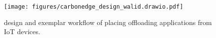 




\begin{figure}[t]
    \centering
    \texttt{[image: figures/carbonedge\_design\_walid.drawio.pdf]}
    \caption{\proposedsystem design and exemplar workflow of placing offloading applications from IoT devices.}
    \label{fig:system_design}
\end{figure}


